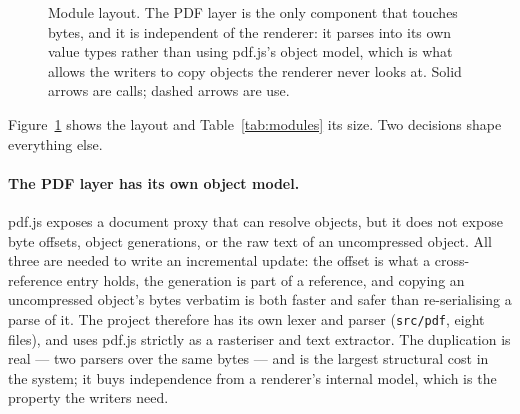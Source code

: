 \begin{figure}[t]
\caption{Module layout. The PDF layer is the only component that touches bytes, and it is
independent of the renderer: it parses into its own value types rather than using pdf.js's
object model, which is what allows the writers to copy objects the renderer never looks at.
Solid arrows are calls; dashed arrows are use.}
\label{fig:arch}
\end{figure}

Figure~\ref{fig:arch} shows the layout and Table~\ref{tab:modules} its size. Two decisions
shape everything else.

\paragraph{The PDF layer has its own object model.} pdf.js exposes a document proxy that can
resolve objects, but it does not expose byte offsets, object generations, or the raw text of
an uncompressed object. All three are needed to write an incremental update: the offset is
what a cross-reference entry holds, the generation is part of a reference, and copying an
uncompressed object's bytes verbatim is both faster and safer than re-serialising a parse of
it. The project therefore has its own lexer and parser (\texttt{src/pdf}, eight files), and
uses pdf.js strictly as a rasteriser and text extractor. The duplication is real --- two
parsers over the same bytes --- and is the largest structural cost in the system; it buys
independence from a renderer's internal model, which is the property the writers need.


